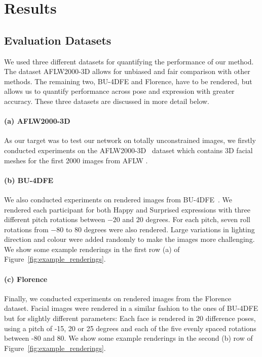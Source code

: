 
\section{Results} \label{S:Results}

\subsection{Evaluation Datasets}

We used three different datasets for quantifying the performance of
our method. The dataset AFLW2000-3D allows for unbiased and fair
comparison with other methods. The remaining two, BU-4DFE and
Florence, have to be rendered, but allows us to quantify performance
across pose and expression with greater accuracy. These three datasets
are discussed in more detail below.

\paragraph{(a) AFLW2000-3D} As our target was to test
our network on totally unconstrained images, we firstly conducted
experiments on the AFLW2000-3D~\cite{zhu2016face} dataset which
contains 3D facial meshes for the first 2000 images from AFLW
\cite{aflw2011}.

\paragraph{(b) BU-4DFE} We also conducted experiments on rendered
images from BU-4DFE~\cite{yin2008high}. We rendered each participant
for both Happy and Surprised expressions with three different pitch
rotations between $-20$ and $20$ degrees. For each pitch, seven roll
rotations from $-80$ to $80$ degrees were also rendered. Large
variations in lighting direction and colour were added randomly to
make the images more challenging. We show some example renderings in
the first row (a) of Figure~\ref{fig:example_renderings}.

\paragraph{(c) Florence}
Finally, we conducted experiments on rendered images from the
Florence~\cite{masi2d3dFaceData} dataset. Facial images were rendered
in a similar fashion to the ones of BU-4DFE but for slightly different
parameters: Each face is rendered in 20 difference poses, using a
pitch of -15, 20 or 25 degrees and each of the five evenly spaced
rotations between -80 and 80. We show some example renderings in the
second (b) row of Figure~\ref{fig:example_renderings}.

